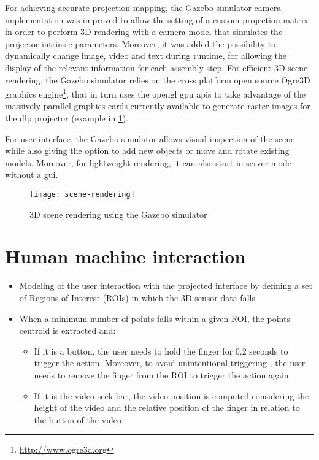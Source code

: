 For achieving accurate projection mapping, the Gazebo simulator camera implementation was improved to allow the setting of a custom projection matrix in order to perform 3D rendering with a camera model that simulates the projector intrinsic parameters. Moreover, it was added the possibility to dynamically change image, video and text during runtime, for allowing the display of the relevant information for each assembly step.
For efficient 3D scene rendering, the Gazebo simulator relies on the cross platform open source Ogre3D graphics engine\footnote{\url{http://www.ogre3d.org}}, that in turn uses the \gls{opengl} \gls{gpu} \glspl{api} to take advantage of the massively parallel graphics cards currently available to generate raster images for the \gls{dlp} projector (example in \cref{fig:scene-rendering}).

For user interface, the Gazebo simulator allows visual inspection of the scene while also giving the option to add new objects or move and rotate existing models. Moreover, for lightweight rendering, it can also start in server mode without a \gls{gui}.

\begin{figure}
	\centering
	\texttt{[image: scene-rendering]}
	\caption{3D scene rendering using the Gazebo simulator}
	\label{fig:scene-rendering}
\end{figure}



\section{Human machine interaction}

\begin{itemize}
	\item Modeling of the user interaction with the projected interface by defining a set of Regions of Interest (ROIs) in which the 3D sensor data falls
	\item When a minimum number of points falls within a given ROI, the points centroid is extracted and:
	\begin{itemize}
		\item If it is a button, the user needs to hold the finger for 0.2 seconds to trigger the action. Moreover, to avoid unintentional triggering , the user needs to remove the finger from the ROI to trigger the action again
		\item If it is the video seek bar, the video position is computed considering the height of the video and the relative position of the finger in relation to the button of the video
	\end{itemize}
\end{itemize}

